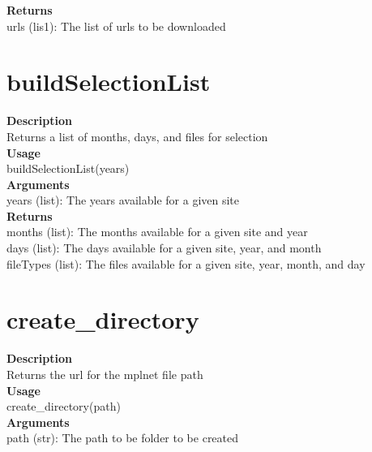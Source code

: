 \documentclass[11pt, oneside]{article}
\begin{document}
\noindent\textbf{Returns} \\
        urls (lis1): The list of urls to be downloaded\\


\section{buildSelectionList}

\textbf{Description} \\
        Returns a list of months, days, and files for selection\\

\noindent\textbf{Usage} \\
        buildSelectionList(years) \\

\noindent\textbf{Arguments} \\
        years (list): The years available for a given site\\

\noindent\textbf{Returns} \\
        months (list): The months available for a given site and year\\
        days (list): The days available for a given site, year, and month\\
        fileTypes (list): The files available for a given site, year, month, and day\\

\newpage

\section{create\_directory}

\textbf{Description} \\
        Returns the url for the mplnet file path\\

\noindent\textbf{Usage} \\
        create\_directory(path) \\

\noindent\textbf{Arguments} \\
        path (str): The path to be folder to be created\\
\end{document}
